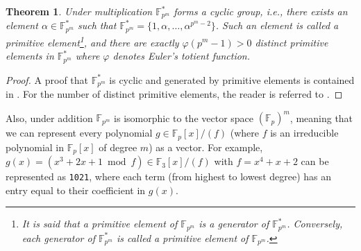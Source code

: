 \documentclass[openany, a4paper, 10pt]{book}
\theoremstyle{plain}
\newtheorem{theorem}{Theorem}[chapter]
\theoremstyle{plain}
\theoremstyle{plain}
\theoremstyle{definition}
\theoremstyle{plain}
\theoremstyle{definition}
\theoremstyle{remark}
\begin{document}
\begin{theorem}
    Under multiplication $\mathbb F_{p^m}^*$ forms a cyclic group,
    i.e., there exists an element $\alpha \in \mathbb F_{p^m}^*$ such that $\mathbb F_{p^m}^* = \{1, \alpha, \dots, \alpha^{p^m-2} \}$.
    Such an element is called a \textit{primitive element}\footnote[2]{
        It is said that a primitive element of $\mathbb F_{p^m}$ is a \textit{generator} of $\mathbb F_{p^m}^*$.
        Conversely, each generator of $\mathbb F_{p^m}^*$ is called a \textit{primitive element} of $\mathbb F_{p^m}$.
    }, and
    there are exactly $\varphi(p^m-1)>0$ distinct primitive elements in $\mathbb F_{p^m}^*$ where $\varphi$ denotes Euler's totient function.
\end{theorem}
\begin{proof}
    A proof that $\mathbb F_{p^m}^*$ is cyclic and generated by primitive elements is contained in \cite[Theorem~1.3]{huo_ff}.
    For the number of distinct primitive elements, the reader is referred to \cite[Theorem~7.13]{Forney_finite_fields}.
\end{proof}

Also, under addition $\mathbb F_{p^m}$ is isomorphic to the vector space $(\mathbb F_p)^m$, meaning that we can represent every polynomial $g \in \mathbb F_p[x]/(f)$ (where $f$ is an irreducible polynomial in $\mathbb F_p[x]$ of degree $m$) as a vector.
For example, $g(x)=(x^3+2x+1 \bmod f)\in \mathbb F_3[x]/(f)$ with $f = x^4+x+2$ can be represented as \texttt{1021}, where each term (from highest to lowest degree) has an entry equal to their coefficient in $g(x)$.
\end{document}

